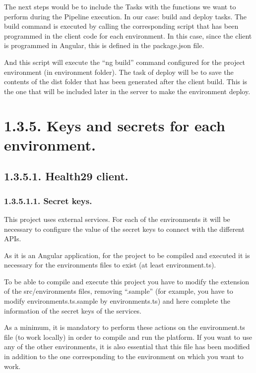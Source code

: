 \documentclass[letterpaper,10pt,english]{sphinxmanual}
\begin{document}
The next steps would be to include the Tasks with the functions we want to perform during the Pipeline execution. In our case: build and deploy tasks.
The build command is executed by calling the corresponding script that has been programmed in the client code for each environment. In this case, since the client is programmed in Angular, this is defined in the package.json file.

And this script will execute the “ng build” command configured for the project environment (in environment folder).
The task of deploy will be to save the contents of the dist folder that has been generated after the client build. This is the one that will be included later in the server to make the environment deploy.


\section{1.3.5. Keys and secrets for each environment.}
\label{\detokenize{pages/Environments/Build_deploy:keys-and-secrets-for-each-environment}}

\subsection{1.3.5.1. Health29 client.}
\label{\detokenize{pages/Environments/Build_deploy:health29-client}}

\subsubsection{1.3.5.1.1. Secret keys.}
\label{\detokenize{pages/Environments/Build_deploy:secret-keys}}
This project uses external services. For each of the environments it will be necessary to configure the value of the secret keys to connect with the different APIs.

As it is an Angular application, for the project to be compiled and executed it is necessary for the environments files to exist (at least environment.ts).

To be able to compile and execute this project you have to modify the extension of the src/environments files, removing “.sample” (for example, you have to modify environments.ts.sample by environments.ts) and here complete the information of the secret keys of the services.

As a minimum, it is mandatory to perform these actions on the environment.ts file (to work locally) in order to compile and run the platform. If you want to use any of the other environments, it is also essential that this file has been modified in addition to the one corresponding to the environment on which you want to work.
\end{document}
